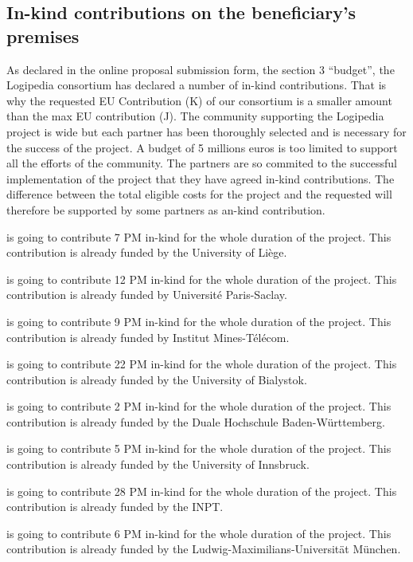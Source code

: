 \subsection*{In-kind contributions on the beneficiary’s premises}

As declared in the online proposal submission form, the section 3
``budget'', the Logipedia consortium has declared a number of in-kind
contributions. That is why the requested EU Contribution (K) of our
consortium is a smaller amount than the max EU contribution (J). The
community supporting the Logipedia project is wide but each partner
has been thoroughly selected and is necessary for the success of the
project.
A budget of 5 millions euros is too limited to support all
the efforts of the community.
The partners are so commited to the successful implementation of the
project that they have agreed in-kind contributions.
The difference between the total
eligible costs for the project and the requested will therefore be
supported by some partners as an-kind contribution.

 is going to contribute 7 PM in-kind for the whole duration of the project.
This contribution is already funded by the University of Liège.

 is going to contribute 12 PM in-kind for the whole duration of the project.
This contribution is already funded by Université Paris-Saclay.

 is going to contribute 9 PM in-kind for the whole duration of the project.
This contribution is already funded by Institut Mines-Télécom.

 is going to contribute 22 PM in-kind for the whole duration of the project.
This contribution is already funded by the University of Bialystok.

 is going to contribute 2 PM in-kind for the whole duration of the project.
This contribution is already funded by the Duale Hochschule Baden-Württemberg.

 is going to contribute 5 PM in-kind for the whole duration of the project.
This contribution is already funded by the University of Innsbruck.

 is going to contribute 28 PM in-kind for the whole duration of the project.
This contribution is already funded by the INPT.

 is going to contribute 6 PM in-kind for the whole duration of the project.
This contribution is already funded by the Ludwig-Maximilians-Universit\"at M\"unchen.

